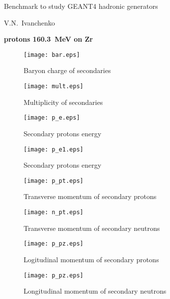 \documentclass[12pt]{article}
\begin{document}
\pagestyle{empty}

\begin{center}
{\large Benchmark to study GEANT4 hadronic generators} 

\vspace*{5mm}
V.N.~Ivanchenko

\vspace*{5mm}


\vspace*{5mm}

{\bf protons 160.3~MeV on Zr} 

\vspace*{5mm}


\end{center}


\begin{figure}[htbp]
\caption{Baryon charge of secondaries}
\label{fig1}  
\centerline{\texttt{[image: bar.eps]}}
\end{figure}
\begin{figure}[htbp]
\caption{Multiplicity of secondaries}
\label{fig1a}  
\centerline{\texttt{[image: mult.eps]}}
\end{figure}
\begin{figure}[htbp]
\caption{Secondary protons energy}
\label{fig2} 
\centerline{\texttt{[image: p\_e.eps]}}
\end{figure}
\begin{figure}[htbp]
\caption{Secondary protons energy}
\label{fig2a} 
\centerline{\texttt{[image: p\_e1.eps]}}
\end{figure}

\newpage

\begin{figure}[htbp]
\caption{Transverse momentum of secondary protons} 
\label{fig3}
\centerline{\texttt{[image: p\_pt.eps]}}
\end{figure}

\newpage

\begin{figure}[htbp]
\caption{Transverse momentum of secondary neutrons} 
\label{fig4}
\centerline{\texttt{[image: n\_pt.eps]}}
\end{figure}

\newpage

\begin{figure}[htbp]
\caption{Logitudinal momentum of secondary protons}
\label{fig5}  
\centerline{\texttt{[image: p\_pz.eps]}}
\end{figure}
\begin{figure}[htbp]
\caption{Longitudinal momentum of secondary neutrons}
\label{fig6} 
\centerline{\texttt{[image: p\_pz.eps]}}
\end{figure}
\end{document}
